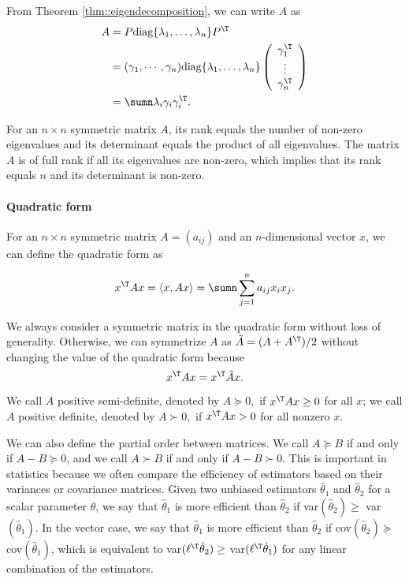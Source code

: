 From Theorem \ref{thm::eigendecomposition}, we can write $A$ as 
\begin{align*}
A & =P\text{diag}\{\lambda_{1},\ldots,\lambda_{n}\}P^{\T}\\
 & =(\gamma_{1},\cdots,\gamma_{n})\text{diag}\{\lambda_{1},\ldots,\lambda_{n}\}\left(\begin{array}{c}
\gamma_{1}^{\T}\\
\vdots\\
\gamma_{n}^{\T}
\end{array}\right)\\
 & =\sumn\lambda_{i}\gamma_{i}\gamma_{i}^{\T}. 
\end{align*}
 

For an $n\times n$ symmetric matrix $A$, its rank equals the number of non-zero eigenvalues
and its determinant equals the product of all eigenvalues. The matrix
$A$ is of full rank if all its eigenvalues are non-zero, which implies
that its rank equals $n$ and its determinant is non-zero.



\paragraph*{Quadratic form}

For an $n\times n$ symmetric matrix $A=(a_{ij})$ and an $n$-dimensional
vector $x$, we can define the quadratic form as

\[
x^{\T}Ax=\langle x,Ax \rangle =\sumn\sum_{j=1}^{n}a_{ij}x_{i}x_{j}.
\]

We always consider a symmetric matrix in the quadratic form without
loss of generality. Otherwise, we can  symmetrize $A$ as $ \tilde{A} =  (A+A^{\T})/2$
without changing the value of the quadratic form because
\[
x^{\T}Ax=x^{\T}  \tilde{A}  x.
\]
 

We call $A$ positive semi-definite, denoted by $A\succeq 0,$ if $x^{\T}Ax\ge0$
for all $x$; we call $A$ positive definite, denoted by $A\succ 0,$
if $x^{\T}Ax>0$ for all nonzero $x.$


We can also define the partial order between matrices. We call $A\succeq B$
if and only if $A-B\succeq0$, and we call $A\succ B$ if and only
if $A-B\succ0$. This is important in statistics because we often
compare the efficiency of estimators based on their variances or covariance matrices. Given two unbiased estimators $\hat\theta_1$ and $\hat\theta_2$ for a scalar parameter $\theta$, we say that $\hat\theta_1$ is more efficient than $\hat\theta_2$ if var$(\hat\theta_2) \geq $ var$(\hat\theta_1)$. In the vector case, we say that $\hat\theta_1$ is more efficient than $\hat\theta_2$  if cov$(\hat\theta_2) \succeq $ cov$(\hat\theta_1)$, which is equivalent to var$(\ell^{\T} \hat\theta_2) \geq $ var$(\ell^{\T}\hat\theta_1)$ for any linear combination of the estimators. 



